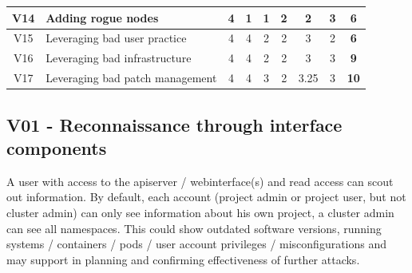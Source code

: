 \begin{landscape}
\begin{table}[]
{\begin{tabular}{|c|l|cccc|cc|c|}
V14             & Adding rogue nodes                                                                     & 4                                        & 1                              & 1                                        & 2                    & 2                                      & 3            & \textbf{6}           \\ \hline
V15             & Leveraging bad user practice                                                           & 4                                        & 4                              & 2                                        & 2                    & 3                                      & 2            & \textbf{6}           \\ \hline
V16             & Leveraging bad infrastructure                                                          & 4                                        & 4                              & 2                                        & 2                    & 3                                      & 3            & \textbf{9}           \\ \hline
V17             & Leveraging bad patch management                                                        & 4                                        & 4                              & 3                                        & 2                    & 3.25                                   & 3            & \textbf{10}          \\ \hline
\end{tabular}%
}
\label{tab:aksRiskTable}
\end{table}
\end{landscape}

\subsection{V01 - Reconnaissance through interface components}

A user with access to the apiserver / webinterface(s) and read access can scout out information.
By default, each account (project admin or project user, but not cluster admin) can only see information about his own project, a cluster admin can see all namespaces.
This could show outdated software versions, running systems / containers / pods / user account privileges / misconfigurations and may support in planning and confirming effectiveness of further attacks.

